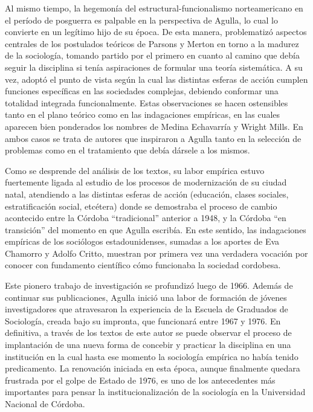 Al mismo tiempo, la hegemonía del estructural-funcionalismo norteamericano en el período de posguerra es palpable en la perspectiva de Agulla, lo cual lo convierte en un legítimo hijo de su época. De esta manera, problematizó aspectos centrales de los postulados teóricos de Parsons y Merton en torno a la madurez de la sociología, tomando partido por el primero en cuanto al camino que debía seguir la disciplina si tenía aspiraciones de formular una teoría sistemática. A su vez, adoptó el punto de vista según la cual las distintas esferas de acción cumplen funciones específicas en las sociedades complejas, debiendo conformar una totalidad integrada funcionalmente. Estas observaciones se hacen ostensibles tanto en el plano teórico como en las indagaciones empíricas, en las cuales aparecen bien ponderados los nombres de Medina Echavarría y Wright Mills. En ambos casos se trata de autores que inspiraron a Agulla tanto en la selección de problemas como en el tratamiento que debía dársele a los mismos.

Como se desprende del análisis de los textos, su labor empírica estuvo fuertemente ligada al estudio de los procesos de modernización de su ciudad natal, atendiendo a las distintas esferas de acción (educación, clases sociales, estratificación social, etcétera) donde se demostraba el proceso de cambio acontecido entre la Córdoba ``tradicional'' anterior a 1948, y la Córdoba ``en transición'' del momento en que Agulla escribía. En este sentido, las indagaciones empíricas de los sociólogos estadounidenses, sumadas a los aportes de Eva Chamorro y Adolfo Critto, muestran por primera vez una verdadera vocación por conocer con fundamento científico cómo funcionaba la sociedad cordobesa.

Este pionero trabajo de investigación se profundizó luego de 1966. Además de continuar sus publicaciones, Agulla inició una labor de formación de jóvenes investigadores que atravesaron la experiencia de la Escuela de Graduados de Sociología, creada bajo su impronta, que funcionará entre 1967 y 1976. En definitiva, a través de los textos de este autor se puede observar el proceso de implantación de una nueva forma de concebir y practicar la disciplina en una institución en la cual hasta ese momento la sociología empírica no había tenido predicamento. La renovación iniciada en esta época, aunque finalmente quedara frustrada por el golpe de Estado de 1976, es uno de los antecedentes más importantes para pensar la institucionalización de la sociología en la Universidad Nacional de Córdoba.

